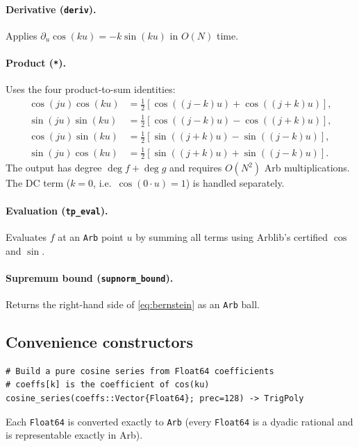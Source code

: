 \documentclass[11pt]{article}
\theoremstyle{definition}
\begin{document}
\paragraph{Derivative (\texttt{deriv}).}
Applies $\partial_u\cos(ku) = -k\sin(ku)$ in $O(N)$ time.

\paragraph{Product (\texttt{*}).}
Uses the four product-to-sum identities:
\begin{align*}
  \cos(ju)\cos(ku) &= \tfrac{1}{2}[\cos((j{-}k)u) + \cos((j{+}k)u)],\\
  \sin(ju)\sin(ku) &= \tfrac{1}{2}[\cos((j{-}k)u) - \cos((j{+}k)u)],\\
  \cos(ju)\sin(ku) &= \tfrac{1}{2}[\sin((j{+}k)u) - \sin((j{-}k)u)],\\
  \sin(ju)\cos(ku) &= \tfrac{1}{2}[\sin((j{+}k)u) + \sin((j{-}k)u)].
\end{align*}
The output has degree $\deg f + \deg g$ and requires $O(N^2)$ Arb
multiplications. The DC term ($k=0$, i.e.\ $\cos(0\cdot u)=1$) is handled
separately.

\paragraph{Evaluation (\texttt{tp\_eval}).}
Evaluates $f$ at an \texttt{Arb} point $u$ by summing all terms using
Arblib's certified $\cos$ and $\sin$.

\paragraph{Supremum bound (\texttt{supnorm\_bound}).}
Returns the right-hand side of \eqref{eq:bernstein} as an \texttt{Arb} ball.

\subsection{Convenience constructors}

\begin{lstlisting}
# Build a pure cosine series from Float64 coefficients
# coeffs[k] is the coefficient of cos(ku)
cosine_series(coeffs::Vector{Float64}; prec=128) -> TrigPoly
\end{lstlisting}
Each \texttt{Float64} is converted exactly to \texttt{Arb} (every
\texttt{Float64} is a dyadic rational and is representable exactly in Arb).
\end{document}
